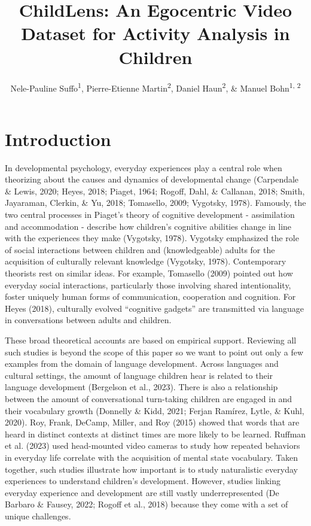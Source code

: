 \documentclass[
  man,floatsintext]{apa6}
\title{ChildLens: An Egocentric Video Dataset for Activity Analysis in Children}
\author{Nele-Pauline Suffo\textsuperscript{1}, Pierre-Etienne Martin\textsuperscript{2}, Daniel Haun\textsuperscript{2}, \& Manuel Bohn\textsuperscript{1, 2}}
\date{}
\affiliation{\vspace{0.5cm}\textsuperscript{1} Institute of Psychology in Education, Leuphana University Lüneburg\\\textsuperscript{2} Max Planck Institute for Evolutionary Anthropology}
\begin{document}
\maketitle

\section{Introduction}\label{introduction}

In developmental psychology, everyday experiences play a central role when theorizing about the causes and dynamics of developmental change (Carpendale \& Lewis, 2020; Heyes, 2018; Piaget, 1964; Rogoff, Dahl, \& Callanan, 2018; Smith, Jayaraman, Clerkin, \& Yu, 2018; Tomasello, 2009; Vygotsky, 1978). Famously, the two central processes in Piaget's theory of cognitive development - assimilation and accommodation - describe how children's cognitive abilities change in line with the experiences they make (Vygotsky, 1978). Vygotsky emphasized the role of social interactions between children and (knowledgeable) adults for the acquisition of culturally relevant knowledge (Vygotsky, 1978). Contemporary theorists rest on similar ideas. For example, Tomasello (2009) pointed out how everyday social interactions, particularly those involving shared intentionality, foster uniquely human forms of communication, cooperation and cognition. For Heyes (2018), culturally evolved ``cognitive gadgets'' are transmitted via language in conversations between adults and children.

These broad theoretical accounts are based on empirical support. Reviewing all such studies is beyond the scope of this paper so we want to point out only a few examples from the domain of language development. Across languages and cultural settings, the amount of language children hear is related to their language development (Bergelson et al., 2023). There is also a relationship between the amount of conversational turn-taking children are engaged in and their vocabulary growth (Donnelly \& Kidd, 2021; Ferjan Ramírez, Lytle, \& Kuhl, 2020). Roy, Frank, DeCamp, Miller, and Roy (2015) showed that words that are heard in distinct contexts at distinct times are more likely to be learned. Ruffman et al. (2023) used head-mounted video cameras to study how repeated behaviors in everyday life correlate with the acquisition of mental state vocabulary. Taken together, such studies illustrate how important is to study naturalistic everyday experiences to understand children's development. However, studies linking everyday experience and development are still vastly underrepresented (De Barbaro \& Fausey, 2022; Rogoff et al., 2018) because they come with a set of unique challenges.
\end{document}
